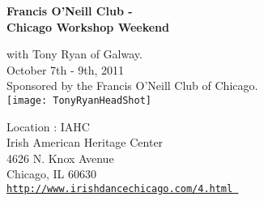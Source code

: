 \vspace{0pt}
\begin{center}
{\large\textbf{Francis O'Neill Club -\\ Chicago Workshop Weekend}}\\ 
\end{center}

with Tony Ryan of Galway.\\October 7th - 9th, 2011\\ Sponsored by the Francis O'Neill Club of Chicago.\\

\vspace*{0.5em}
\texttt{[image: TonyRyanHeadShot]}

\vspace*{0.5em}
Location : IAHC\\
Irish American Heritage Center\\
4626 N. Knox Avenue\\
Chicago, IL  60630 \\

\href{http://www.irishdancechicago.com/4.html}{\tt http://www.irishdancechicago.com/4.html }
